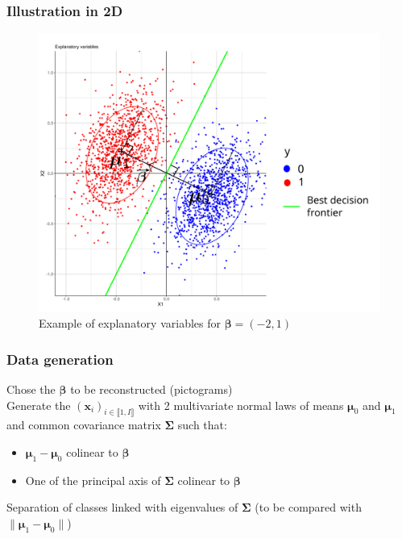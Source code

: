 \documentclass{beamer}
\begin{document}
\begin{frame}
    \frametitle{Illustration in 2D}

    \begin{figure}
        \centering
        \includegraphics[scale = 0.2]{images/2D_better.png}
        \caption{Example of explanatory variables for $\bm{\beta} = (-2,1)$}
    \end{figure}
\end{frame}

\begin{frame}
    \frametitle{Data generation}
    Chose the $\bm{\beta}$ to be reconstructed (pictograms)\\[10 pt]
    Generate the $(\mathbf{x}_i)_{i \in \llbracket 1, I\rrbracket}$ with 2 multivariate normal laws of means $\bm{\mu}_0$ and $\bm{\mu}_1$ and common covariance matrix $\bm{\Sigma}$ such that:
    \begin{itemize}
        \item $\bm{\mu}_1 - \bm{\mu}_0$ colinear to $\bm{\beta}$\\[10 pt]
        \item One of the principal axis of $\bm{\Sigma}$ colinear to $\bm{\beta}$
    \end{itemize}
    Separation of classes linked with eigenvalues of $\bm{\Sigma}$ (to be compared with $\lVert\bm{\mu}_1 - \bm{\mu}_0 \rVert$)
\end{frame}
\end{document}
